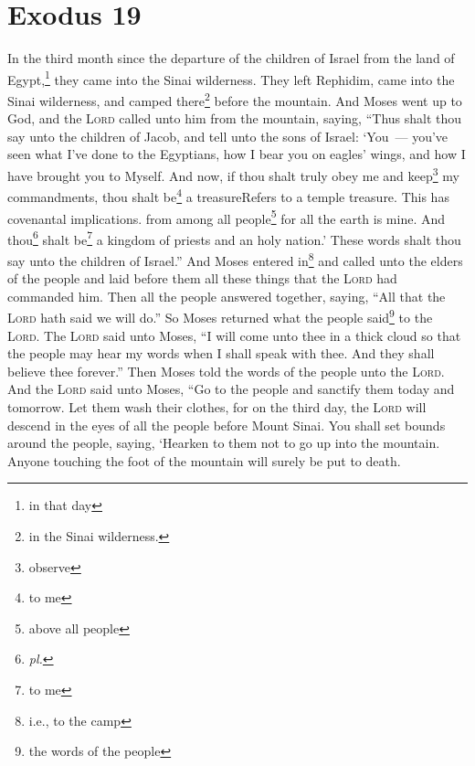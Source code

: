 \section{Exodus 19}\label{exodus:19}
\begin{enumerate}[align=center]
     In the third month since the departure of the children of Israel from the land of Egypt,\footnote{in that day} they came into the Sinai wilderness.%
     They left Rephidim, came into the Sinai wilderness, and camped there\footnote{in the Sinai wilderness.} before the mountain.%
     And Moses went up to God, and the \textsc{Lord} called unto him from the mountain, saying, ``Thus shalt thou say unto the children of Jacob, and tell unto the sons of Israel:%
     `You~--- you've seen what I've done to the Egyptians, how I bear you on eagles' wings, and how I have brought you to Myself.%
     And now, if thou shalt truly obey me and keep\footnote{observe} my commandments, thou shalt be\footnote{to me} a treasure{Refers to a temple treasure. This has covenantal implications.} from among all people\footnote{above all people} for all the earth is mine.%
     And thou\footnote{\emph{pl.}} shalt be\footnote{to me} a kingdom of priests and an holy nation.' These words shalt thou say unto the children of Israel.''%
     And Moses entered in\footnote{i.e., to the camp} and called unto the elders of the people and laid before them all these things that the \textsc{Lord} had commanded him.%
     Then all the people answered together, saying, ``All that the \textsc{Lord} hath said we will do.'' So Moses returned what the people said\footnote{the words of the people} to the \textsc{Lord}.%
     The \textsc{Lord} said unto Moses, ``I will come unto thee in a thick cloud so that the people may hear my words when I shall speak with thee. And they shall believe thee forever.'' Then Moses told the words of the people unto the \textsc{Lord}.%
     And the \textsc{Lord} said unto Moses, ``Go to the people and sanctify them today and tomorrow. Let them wash their clothes,%
     for on the third day, the \textsc{Lord} will descend in the eyes of all the people before Mount Sinai.%
     You shall set bounds around the people, saying, `Hearken to them not to go up into the mountain. Anyone touching the foot of the mountain will surely be put to death.%

\end{enumerate}
